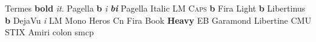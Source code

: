 \documentclass{article}
\begin{document}
Termes \textbf{bold} \textit{it}.
{\zza Pagella \textbf{b} \textit{i} \textbf{\textit{bi}}}
{\zzc Pagella Italic} {\zzd LM \textsc{Caps} \textbf{b}} {\zze Fira Light \textbf{b}}
{\zzf Libertinus \textbf{b}} {\zzg DejaVu \textit{i}} {\zzii LM Mono} {\zzj Heros Cn}
{\zzk Fira Book \textbf{Heavy}} {\zzl EB Garamond} {\zzn Libertine} {\zzo CMU} {\zzp STIX}
{\zzr Amiri} {\zzt colon smcp}
\end{document}
